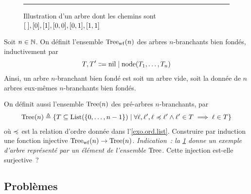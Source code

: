 \begin{exercise}\label{exo.ind.arbres}

  \begin{figure}[t]
    \centering

    \vspace{0.2cm}
    \hrule

    \vspace{0.2cm}
    \caption{Illustration d'un arbre dont les chemins sont
      $[\;],[0],[1],[0,0],[0,1],[1,1]$}
    \label{fig.ind.arbre}
  \end{figure}
  
  Soit $n \in \mathbb N$. On définit l'ensemble $\operatorname{Tree}_{\mathrm{wf}}(n)$ des arbres
  $n$-branchants bien fondés, inductivement par
  \[\varTree,\varTree' \inddefeq \nil \mid \node(\varTree_1,\ldots,\varTree_n)\]
  Ainsi, un arbre $n$-branchant bien fondé est soit un arbre vide,
  soit la donnée de $n$ arbres eux-mêmes $n$-branchants bien fondés.

  \noindent
  On définit aussi l'ensemble $\operatorname{Tree}(n)$ des pré-arbres $n$-branchants, par
  \[\operatorname{Tree}(n) \triangleq
  \left\{ T \subseteq \operatorname{List}(\{0,\ldots,n - 1\}) \;\middle\vert\; \forall \ell,\ell',
          \ell \preccurlyeq \ell' \land
          \ell' \in T \implies \ell \in T \right\}\]
  où $\preccurlyeq$ est la relation d'ordre donnée dans l'\cref{exo.ord.list}.
  Construire par induction une fonction injective $\operatorname{Tree}_{\mathrm{wf}}(n) \to \operatorname{Tree}(n)$.
  \textit{Indication~: la \cref{fig.ind.arbre} donne un exemple d'arbre
  représenté par un élément de l'ensemble $\operatorname{Tree}$.}
  Cette injection est-elle surjective~?
\end{exercise}

\clearpage

\subsection{Problèmes}

